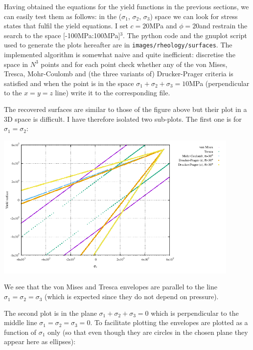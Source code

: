 Having obtained the equations for the yield functions in the previous sections, we can easily test
them as follows: in the ($\sigma_1$, $\sigma_2$, $\sigma_3$) space we can look for stress states 
that fulfil the yield equations. I set $c=20$MPa and $\phi=20$\degree and restrain 
the search to the space [-100MPa:100MPa]$^3$.
The python code and the gnuplot script used to generate the plots hereafter 
are in {\tt images/rheology/surfaces}. The implemented algorithm is somewhat  
naive and quite inefficient: discretise the space in $N^3$ points and for each point 
check whether any of the von Mises, Tresca, Mohr-Coulomb and (the three variants of) Drucker-Prager 
criteria is satisfied and when the point is in the space $\sigma_1+\sigma_2+\sigma_3=10$MPa 
(perpendicular to the $x=y=z$ line) write it to the corresponding file.

The recovered surfaces are similar to those of the figure above but their plot in a 3D space is difficult.
I have therefore isolated two sub-plots. 
The first one is for $\sigma_1=\sigma_2$:

\begin{center}
\includegraphics[width=12cm]{images/rheology/surfaces/surfaces_xy.pdf}
\end{center}
We see that the von Mises and Tresca envelopes are parallel to the line $\sigma_1=\sigma_2=\sigma_3$ (which 
is expected since they do not depend on pressure).

The second plot is in the plane $\sigma_1+\sigma_2+\sigma_3=0$ which is perpendicular to the middle line 
$\sigma_1=\sigma_2=\sigma_3=0$. To facilitate plotting the envelopes are plotted as a function of $\sigma_1$ only (so that even though they are circles in the chosen plane they appear here as ellipses):

